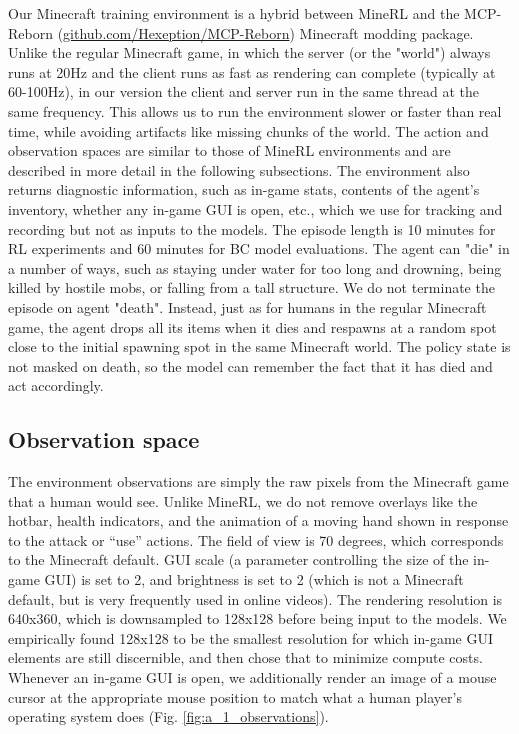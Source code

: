 Our Minecraft training environment is a hybrid between MineRL \cite{guss2019minerl} and the MCP-Reborn (\href{https://github.com/Hexeption/MCP-Reborn}{github.com/Hexeption/MCP-Reborn}) Minecraft modding package. Unlike the regular Minecraft game, in which the server (or the "world") always runs at 20Hz and the client runs as fast as rendering can complete (typically at 60-100Hz), in our version the client and server run in the same thread at the same frequency. This allows us to run the environment slower or faster than real time, while avoiding artifacts like missing chunks of the world. The action and observation spaces are similar to those of MineRL environments and are described in more detail in the following subsections. The environment also returns diagnostic information, such as in-game stats, contents of the agent's inventory, whether any in-game GUI is open, etc., which we use for tracking and recording but not as inputs to the models. The episode length is 10 minutes for RL experiments and 60 minutes for BC model evaluations. The agent can "die" in a number of ways, such as staying under water for too long and drowning, being killed by hostile mobs, or falling from a tall structure. We do not terminate the episode on agent "death". Instead, just as for humans in the regular Minecraft game, the agent drops all its items when it dies and respawns at a random spot close to the initial spawning spot in the same Minecraft world. The policy state is not masked on death, so the model can remember the fact that it has died and act accordingly.

\subsection{Observation space}
\label{appendix:minecraft_env_observation_space}
The  environment observations are simply the raw pixels from the Minecraft game that a human would see. Unlike MineRL, we do not remove overlays like the hotbar, health indicators, and the animation of a moving hand shown in response to the attack or ``use'' actions. The field of view is 70 degrees, which corresponds to the Minecraft default. GUI scale (a parameter controlling the size of the in-game GUI) is set to 2, and brightness is set to 2 (which is not a Minecraft default, but is very frequently used in online videos).  The rendering resolution is 640x360, which is downsampled to 128x128 before being input to the models. We empirically found 128x128 to be the smallest resolution for which in-game GUI elements are still discernible, and then chose that to minimize compute costs. Whenever an in-game GUI is open, we additionally render an image of a mouse cursor at the appropriate mouse position to match what a human player's operating system does (Fig. \ref{fig:a_1_observations}).


